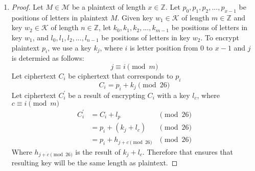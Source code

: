 \documentclass[11pt]{article}
\newcommand{\K}{\mathcal{K}}
\newcommand{\M}{\mathcal{M}}
\newcommand{\Z}{\mathbb{Z}}
\theoremstyle{definition}
\begin{document}
\begin{enumerate}
  \item
    \begin{proof}
      Let $M \in \M$ be a plaintext of length $x \in \Z$. Let $p_0, p_1, p_2, ...,p_{x - 1}$ be positions of letters in plaintext $M$. Given key $w_1 \in \K$ of length $m \in \Z$ and key $w_2 \in \K$ of length $n \in \Z$, let $k_0, k_1, k_2, ...,k_{m - 1}$ be positions of letters in key $w_1$, and $l_0, l_1, l_2, ...,l_{n - 1}$ be positions of letters in key $w_2$. To encrypt plaintext $p_i$, we use a key $k_j$, where $i$ is letter position from $0$ to $x - 1$ and $j$ is determied as follows:
      \[
        j \equiv i \pmod m
      \]
      Let ciphertext $C_i$ be ciphertext that corresponds to $p_i$
      \[
        C_i = p_i + k_j \pmod {26}
      \]
      Let ciphertext $C^{'}_i$ be a result of encrypting $C_i$ with a key $l_c$, where $c \equiv i \pmod m$
      \begin{equation*}
      \begin{aligned}
        C^{'}_i &= C_i + l_p &\pmod {26} \\
                &= p_i + (k_j + l_c) &\pmod {26} \\
                &= p_i + h_{j + c \pmod{26}} &\pmod {26}
      \end{aligned}
      \end{equation*}
      Where $h_{j + c \pmod{26}}$ is the result of $k_j + l_c$. Therefore that ensures that resulting key will be the same length as plaintext.
    \end{proof}
\end{enumerate}

\newpage
\end{document}
